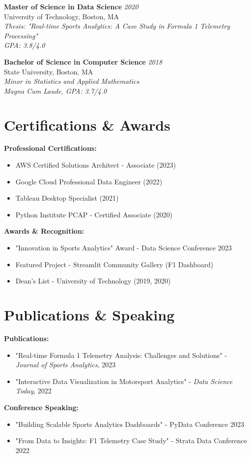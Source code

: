 \documentclass[letterpaper,11pt]{article}
\begin{document}
\textbf{Master of Science in Data Science} \hfill \textit{2020}\\
University of Technology, Boston, MA\\
\textit{Thesis: "Real-time Sports Analytics: A Case Study in Formula 1 Telemetry Processing"}\\
\textit{GPA: 3.8/4.0}

\textbf{Bachelor of Science in Computer Science} \hfill \textit{2018}\\
State University, Boston, MA\\
\textit{Minor in Statistics and Applied Mathematics}\\
\textit{Magna Cum Laude, GPA: 3.7/4.0}

\section{Certifications \& Awards}

\textbf{Professional Certifications:}
\begin{itemize}[leftmargin=0.5in, itemsep=0pt]
    \item AWS Certified Solutions Architect - Associate (2023)
    \item Google Cloud Professional Data Engineer (2022)
    \item Tableau Desktop Specialist (2021)
    \item Python Institute PCAP - Certified Associate (2020)
\end{itemize}

\textbf{Awards \& Recognition:}
\begin{itemize}[leftmargin=0.5in, itemsep=0pt]
    \item "Innovation in Sports Analytics" Award - Data Science Conference 2023
    \item Featured Project - Streamlit Community Gallery (F1 Dashboard)
    \item Dean's List - University of Technology (2019, 2020)
\end{itemize}

\section{Publications \& Speaking}

\textbf{Publications:}
\begin{itemize}[leftmargin=0.5in, itemsep=0pt]
    \item "Real-time Formula 1 Telemetry Analysis: Challenges and Solutions" - \textit{Journal of Sports Analytics}, 2023
    \item "Interactive Data Visualization in Motorsport Analytics" - \textit{Data Science Today}, 2022
\end{itemize}

\textbf{Conference Speaking:}
\begin{itemize}[leftmargin=0.5in, itemsep=0pt]
    \item "Building Scalable Sports Analytics Dashboards" - PyData Conference 2023
    \item "From Data to Insights: F1 Telemetry Case Study" - Strata Data Conference 2022
\end{itemize}
\end{document}

